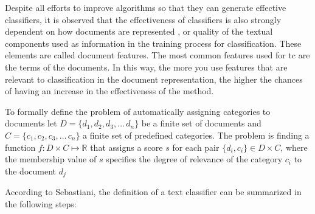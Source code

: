 Despite all efforts to improve algorithms so that they can generate effective classifiers, it is observed that the effectiveness of classifiers is also strongly dependent on how documents are represented \cite{Gabrilovich:2006, bekkerman2004using, supreethi2010novel}, or quality of the textual components used as information in the training process for classification. These elements are called document features. The most common features used for \gls{tc} are the terms of the documents. In this way, the more you use features that are relevant to classification in the document representation, the higher the chances of having an increase in the effectiveness of the method.


To formally define the problem of automatically assigning categories to documents let $D = \{d_1,d_2,d_3,\ldots\,d_n\}$ be a finite set of documents and $C = \{c_1,c_2,c_3,\ldots\,c_n\}$ a finite set of predefined categories.
The problem is finding a function $f: D \times C \mapsto \mathbb{R}$ that assigns a score $s$ for each pair 
$\{d_i, c_i\} \in  D \times C $, where the membership value of  $s$ specifies the degree of relevance of the category $c_i$ to the document $d_j$

According to Sebastiani\cite{Sebastiani:2002}, the definition of a text classifier can be summarized in the following steps:

